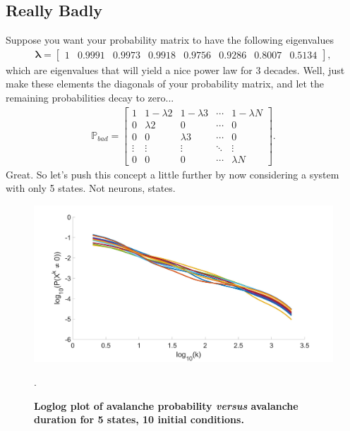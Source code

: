 \documentclass[superscriptaddress]{revtex4-1}
\newcommand{\prob}{\mathbb{P}}
\begin{document}
\subsection{Really Badly}
Suppose you want your probability matrix to have the following eigenvalues
\begin{align*}
\bm{\lambda} = 
\begin{bmatrix}
1 & 0.9991 & 0.9973 & 0.9918 & 0.9756 & 0.9286 & 0.8007 & 0.5134
\end{bmatrix},
\end{align*}
which are eigenvalues that will yield a nice power law for 3 decades. Well, just make these elements the diagonals of your probability matrix, and let the remaining probabilities decay to zero...
\begin{align*}
\prob_{bad} = 
\begin{bmatrix}
1      & 1-\lambda{2} & 1-\lambda{3} & \dotsm & 1-\lambda{N}\\
0      & \lambda{2}   & 0            & \dotsm & 0\\
0      & 0            & \lambda{3}   & \dotsm & 0\\
\vdots & \vdots       & \vdots       & \ddots & \vdots\\
0      & 0            & 0            & \dotsm & \lambda{N}
\end{bmatrix}.
\end{align*}
Great. So let's push this concept a little further by now considering a system with only 5 states. Not neurons, states.
\begin{figure}[h!]
	\centering
	\includegraphics[width=0.5\columnwidth]{power_prob_con_5states.jpg}
	\caption{\textbf{Loglog plot of avalanche probability \emph{versus} avalanche duration for 5 states, 10 initial conditions.}}.
\end{figure}
\end{document}
